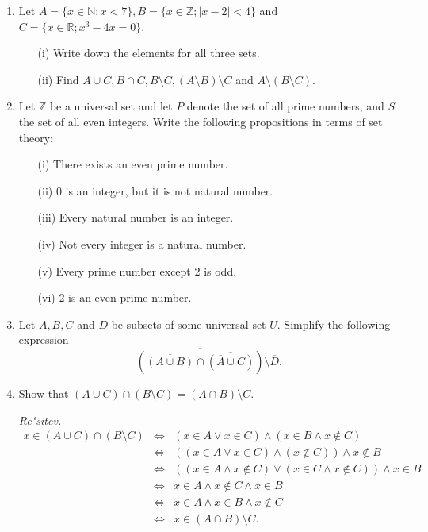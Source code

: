 \documentclass[11pt,paper=b5,footinclude,headinclude]{scrbook} %
\begin{document}
\begin{enumerate}
\item Let $A = \{ x \in \mathbb{N}; x < 7\}, B = \{x \in  \mathbb{Z}; |x - 2| < 4\}$ and $C = \{x \in\mathbb{R}; x^3 -  4x = 0\}$.
\begin{enumerate}
\item[(i)]  Write down the elements for all three sets.
\item[(ii)] Find $A \cup C, B \cap C, B \setminus C, (A \setminus B) \setminus C$ and $A \setminus (B \setminus C)$.
\end{enumerate}

\item Let  $\mathbb{Z}$ be a universal set and let  $P$ denote the set of all prime numbers, and $S$ the set of all even integers. Write the following propositions in terms of set theory:
\begin{itemize}
\item[(i)] There exists an even prime number. 
\item[(ii)] $0$ is an integer, but it is not natural number. 
\item[(iii)] Every natural number is an integer. 
\item[(iv)] Not every integer is a natural number. 
\item[(v)] Every prime number except 2 is odd. 
\item[(vi)] 2 is an even prime number. \quad [$2\in S\cap P$]
\end{itemize}

\item Let  $A, B, C$ and $D$  be subsets of some universal set  $U$. Simplify the following expression
$$\overline{(\overline{(A\cup B)} \cap \overline{(\overline{A} \cup C)})}\setminus \overline{D}.$$

\item Show that $(A\cup C)\cap (B\setminus C) = (A\cap B)\setminus C$.

\emph{ Re"sitev.} 
\begin{eqnarray*}
x\in (A\cup C)\cap (B\setminus C) &\Leftrightarrow & (x\in A \vee x\in C) \wedge (x\in B \wedge x\notin C)\\
 &\Leftrightarrow & ((x\in A \vee x\in C) \wedge (x\notin C))\wedge x\notin B\\
&\Leftrightarrow & ((x\in A \wedge x\notin C) \vee (x\in C \wedge x\notin C)) \wedge
 x\in B\\
&\Leftrightarrow & x\in A \wedge x\notin C  \wedge x\in B\\
&\Leftrightarrow & x\in A \wedge x\in B  \wedge x\notin C \\
&\Leftrightarrow & x \in (A\cap B)\setminus C. 
\end{eqnarray*}


\end{enumerate}
\end{document}
